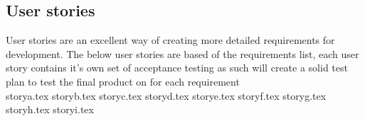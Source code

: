 \subsection{User stories}
User stories are an excellent way of creating more detailed requirements for development. The below user stories are based of the requirements list, each user story contains it's own set of acceptance testing as such will create a solid test plan to test the final product on for each requirement\\

{storya.tex}
{storyb.tex}
{storyc.tex}
{storyd.tex}
{storye.tex}
{storyf.tex}
{storyg.tex}
{storyh.tex}
{storyi.tex}




